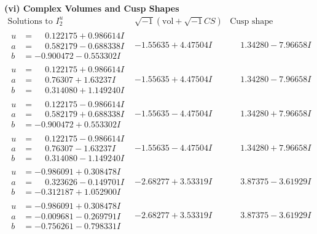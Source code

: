 \documentclass[1p]{elsarticle_modified}
\theoremstyle{definition}
\newcommand{\I}{\sqrt{-1}}
\begin{document}
\newpage\flushleft \textbf{(vi) Complex Volumes and Cusp Shapes}
$$\begin{array}{c|c|c}  
\text{Solutions to }I^u_{2}& \I (\text{vol} + \sqrt{-1}CS) & \text{Cusp shape}\\
 \hline 
\begin{aligned}
u &= \phantom{-}0.122175 + 0.986614 I \\
a &= \phantom{-}0.582179 - 0.688338 I \\
b &= -0.900472 - 0.553302 I\end{aligned}
 & -1.55635 + 4.47504 I & \phantom{-}1.34280 - 7.96658 I \\ \hline\begin{aligned}
u &= \phantom{-}0.122175 + 0.986614 I \\
a &= \phantom{-}0.76307 + 1.63237 I \\
b &= \phantom{-}0.314080 + 1.149240 I\end{aligned}
 & -1.55635 + 4.47504 I & \phantom{-}1.34280 - 7.96658 I \\ \hline\begin{aligned}
u &= \phantom{-}0.122175 - 0.986614 I \\
a &= \phantom{-}0.582179 + 0.688338 I \\
b &= -0.900472 + 0.553302 I\end{aligned}
 & -1.55635 - 4.47504 I & \phantom{-}1.34280 + 7.96658 I \\ \hline\begin{aligned}
u &= \phantom{-}0.122175 - 0.986614 I \\
a &= \phantom{-}0.76307 - 1.63237 I \\
b &= \phantom{-}0.314080 - 1.149240 I\end{aligned}
 & -1.55635 - 4.47504 I & \phantom{-}1.34280 + 7.96658 I \\ \hline\begin{aligned}
u &= -0.986091 + 0.308478 I \\
a &= \phantom{-}0.323626 - 0.149701 I \\
b &= -0.312187 + 1.052900 I\end{aligned}
 & -2.68277 + 3.53319 I & \phantom{-}3.87375 - 3.61929 I \\ \hline\begin{aligned}
u &= -0.986091 + 0.308478 I \\
a &= -0.009681 - 0.269791 I \\
b &= -0.756261 - 0.798331 I\end{aligned}
 & -2.68277 + 3.53319 I & \phantom{-}3.87375 - 3.61929 I \\ \hline\begin{aligned}

\end{aligned}
\end{array}$$
\end{document}
